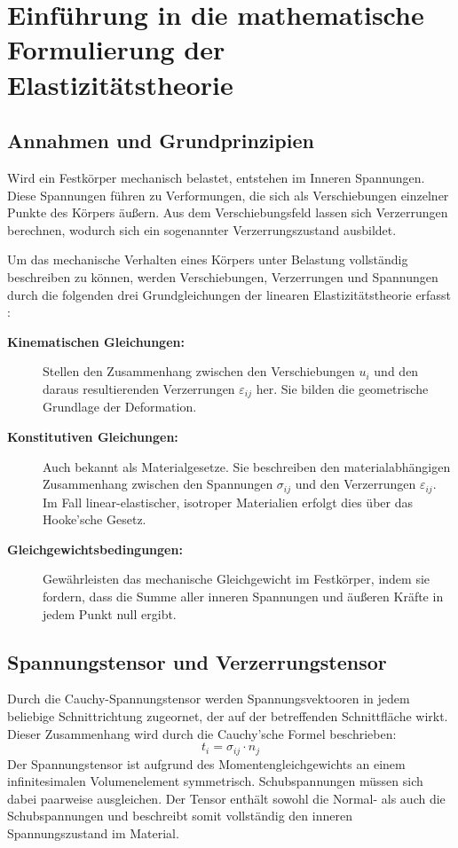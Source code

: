 %
%
%
%
\section{Einführung in die mathematische Formulierung der Elastizitätstheorie}
\label{elastomechanik:section:teil2}
\subsection{Annahmen und Grundprinzipien}
Wird ein Festkörper mechanisch belastet, entstehen im Inneren Spannungen. Diese Spannungen führen zu Verformungen, die sich als Verschiebungen einzelner Punkte des Körpers äußern.
Aus dem Verschiebungsfeld lassen sich Verzerrungen berechnen, wodurch sich ein sogenannter Verzerrungszustand ausbildet.

Um das mechanische Verhalten eines Körpers unter Belastung vollständig beschreiben zu können, werden Verschiebungen, Verzerrungen und Spannungen durch die folgenden drei Grundgleichungen der linearen Elastizitätstheorie erfasst \cite{elastomechanik:Technische Mechanik 2:Elastostatik}:

\begin{description}
	\item [\textbf{Kinematischen Gleichungen:}] Stellen den Zusammenhang zwischen den Verschiebungen $u_i$ und den daraus resultierenden Verzerrungen $\varepsilon_{ij}$ her. 
	Sie bilden die geometrische Grundlage der Deformation.
	
	\item [\textbf{Konstitutiven Gleichungen:}] Auch bekannt als Materialgesetze. 
	Sie beschreiben den materialabhängigen Zusammenhang zwischen den Spannungen $\sigma_{ij}$ und den Verzerrungen $\varepsilon_{ij}$. 
	Im Fall linear-elastischer, isotroper Materialien erfolgt dies über das Hooke’sche Gesetz.
	
	\item [\textbf{Gleichgewichtsbedingungen:}] Gewährleisten das mechanische Gleichgewicht im Festkörper, indem sie fordern, dass die Summe aller inneren Spannungen und äußeren Kräfte in jedem Punkt null ergibt.
\end{description}

\subsection{Spannungstensor und Verzerrungstensor}
Durch die Cauchy-Spannungstensor werden Spannungsvektooren in jedem beliebige Schnittrichtung zugeornet, der auf der betreffenden Schnittfläche wirkt.
Dieser Zusammenhang wird durch die Cauchy’sche Formel beschrieben:
	\begin{equation}
		t_i = 
		\sigma_{ij} \cdot n_j
	\end{equation}
Der Spannungstensor ist aufgrund des Momentengleichgewichts an einem infinitesimalen Volumenelement symmetrisch. Schubspannungen müssen sich dabei paarweise ausgleichen. 
Der Tensor enthält sowohl die Normal- als auch die Schubspannungen und beschreibt somit vollständig den inneren Spannungszustand im Material.


